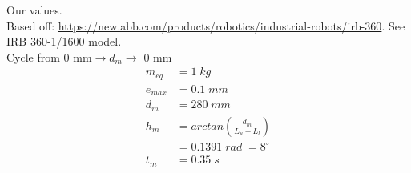 Our values.\\
Based off:  \url{https://new.abb.com/products/robotics/industrial-robots/irb-360}. See IRB 360-1/1600 model.\\
Cycle from 0 mm$\rightarrow d_m \rightarrow$ 0 mm
\begin{equation}
\nonumber
\begin{aligned}
m_{eq}&=1 \; kg\\
e_{max}&=0.1 \; mm \\ %
d_m& = 280 \; mm \\
h_m&=arctan\left(\frac{d_m}{L_u+L_l}\right) \\
  &=0.1391 \; rad \; = 8^{\circ} \\
t_m&=0.35 \; s
\end{aligned}
\end{equation}  

